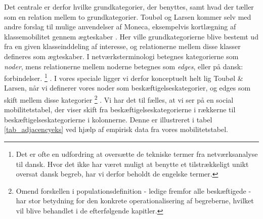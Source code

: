 Det centrale er derfor hvilke grundkategorier, der benyttes, samt hvad der tæller som en relation mellem to grundkategorier. Toubøl og Larsen kommer selv med andre forslag til mulige anvendelser af Moneca, eksempelvis kortlægning af klassemobilitet gennem ægteskaber \parencite[27]{Touboel2013}. Her ville grundkategorierne blive bestemt ud fra en given klasseinddeling af interesse, og relationerne mellem disse klasser defineres som ægteskaber. I netværksterminologi betegnes kategorierne som \emph{noder}, mens relationerne mellem noderne betegnes som \emph{edges}, eller på dansk: forbindelser.%
%
\footnote{Det er ofte en udfordring at oversætte de tekniske termer fra netværksanalyse til dansk. Hvor det ikke har været muligt  at benytte et tilstrækkeligt unikt oversat dansk begreb, har vi derfor beholdt de engelske termer.}%
%
. I vores speciale ligger vi derfor konceptuelt helt lig Toubøl \& Larsen, når vi definerer vores noder som beskæftigelseskategorier, og edges som skift mellem disse kategorier%
%
\footnote{Omend forskellen i populationsdefinition - ledige fremfor alle beskæftigede - har stor betydning for den konkrete operationalisering af begreberne, hvilket vil blive behandlet i de efterfølgende kapitler.}%
%
. Vi har det til fælles, at vi ser på en social mobilitetstabel, der viser skift fra beskæftigelseskategorierne i rækkerne til beskæftigelseskategorierne i kolonnerne. Denne er illustreret i tabel \ref{tab_adjacencyeks} ved hjælp af empirisk data fra vores mobilitetstabel.
%
\begin{table}[H] \centering
\caption{Eksempel på en adjacency matrice}
\label{tab_adjacencyeks}
\end{table}
% 


